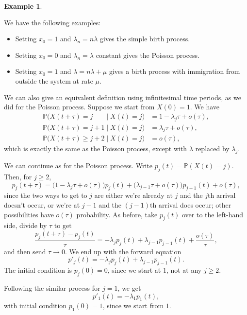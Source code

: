 \documentclass[
  a4paper,
]{article}
\providecommand{\tightlist}{%
  \setlength{\itemsep}{0pt}\setlength{\parskip}{0pt}}
\theoremstyle{definition}
\theoremstyle{definition}
\newtheorem{example}{Example}[section]
\theoremstyle{definition}
\theoremstyle{remark}
\begin{document}
\begin{example}
\protect\hypertarget{exm:birth-examples}{}\label{exm:birth-examples}

We have the following examples:

\begin{itemize}
\tightlist
\item
  Setting \(x_0 = 1\) and \(\lambda_n = n\lambda\) gives the simple birth process.
\item
  Setting \(x_0 = 0\) and \(\lambda_n = \lambda\) constant gives the Poisson process.
\item
  Setting \(x_0 = 1\) and \(\lambda = n\lambda + \mu\) gives a birth process with immigration from outside the system at rate \(\mu\).
\end{itemize}

\end{example}

We can also give an equivalent definition using infinitesimal time periods, as we did for the Poisson process. Suppose we start from \(X(0) = 1\). We have
\begin{align*}
    \mathbb P \big(X(t+\tau) = j\phantom{{}+1} \mid X(t) = j\big) &= 1 - \lambda_j\tau + o(\tau) ,\\
    \mathbb P \big(X(t+\tau) = j+1 \mid X(t) = j\big) &= \lambda_j\tau + o(\tau) ,\\
    \mathbb P \big(X(t+\tau) \geq j+2 \mid X(t) = j\big) &= o(\tau) ,
\end{align*}
which is exactly the same as the Poisson process, except with \(\lambda\) replaced by \(\lambda_j\).

We can continue as for the Poisson process. Write \(p_j(t) = \mathbb P(X(t) = j)\). Then, for \(j \geq 2\),
\[ p_j(t + \tau) = \big(1 - \lambda_{j}\tau + o(\tau)\big)p_j(t)  + \big(\lambda_{j-1}\tau + o(\tau)\big)p_{j-1}(t) + o(\tau) , \]
since the two ways to get to \(j\) are either we're already at \(j\) and the \(j\)th arrival doesn't occur, or we're at \(j-1\) and the \((j-1)\)th arrival does occur; other possibilities have \(o(\tau)\) probability. As before, take \(p_j(t)\) over to the left-hand side, divide by \(\tau\) to get
\[ \frac{p_j(t + \tau) - p_j(t)}{\tau} = -\lambda_j p_j(t) + \lambda_{j-1}p_{j-1}(t) + \frac{o(\tau)}{\tau} , \]
and then send \(\tau \to 0\). We end up with the forward equation
\[ p'_j(t) = -\lambda_j p_j(t) + \lambda_{j-1}p_{j-1}(t) . \]
The initial condition is \(p_j(0) = 0\), since we start at \(1\), not at any \(j \geq 2\).

Following the similar process for \(j =1\), we get
\[ p'_1(t) = -\lambda_1 p_1(t) , \]
with initial condition \(p_1(0) = 1\), since we start from \(1\).
\end{document}
